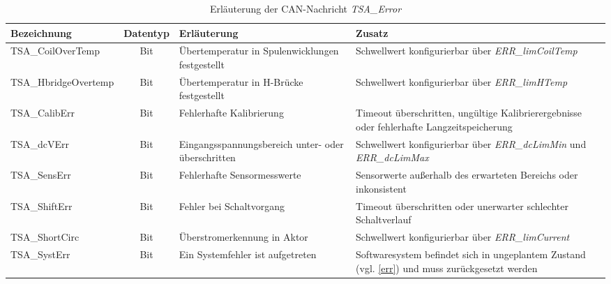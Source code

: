 \begin{table}%
\centering
\begin{tabular}{l c p{6cm} p{4cm}}
\hline
Bezeichnung & Datentyp & Erläuterung & Zusatz \\
\hline
TSA\_CoilOverTemp & Bit & Übertemperatur in Spulenwicklungen festgestellt & Schwellwert konfigurierbar über \textit{ERR\_limCoilTemp} \newline \\
TSA\_HbridgeOvertemp & Bit & Übertemperatur in H-Brücke festgestellt & Schwellwert konfigurierbar über \textit{ERR\_limHTemp} \newline \\
TSA\_CalibErr & Bit & Fehlerhafte Kalibrierung & Timeout überschritten, ungültige Kalibrierergebnisse oder fehlerhafte Langzeitspeicherung \newline \\
TSA\_dcVErr & Bit &  Eingangsspannungsbereich unter- oder überschritten & Schwellwert konfigurierbar über \textit{ERR\_dcLimMin} und \textit{ERR\_dcLimMax} \newline \\
TSA\_SensErr & Bit & Fehlerhafte Sensormesswerte & Sensorwerte außerhalb des erwarteten Bereichs oder inkonsistent \newline \\
TSA\_ShiftErr & Bit & Fehler bei Schaltvorgang & Timeout überschritten oder unerwarter schlechter Schaltverlauf \newline \\
TSA\_ShortCirc & Bit &  Überstromerkennung in Aktor & Schwellwert konfigurierbar über \textit{ERR\_limCurrent} \newline \\
TSA\_SystErr& Bit & Ein Systemfehler ist aufgetreten & Softwaresystem befindet sich in ungeplantem Zustand (vgl. \autoref{err}) und muss zurückgesetzt werden \newline \\

\end{tabular}
\caption{Erläuterung der CAN-Nachricht \textit{TSA\_Error}}
\label{tab_tsa_error}
\end{table}